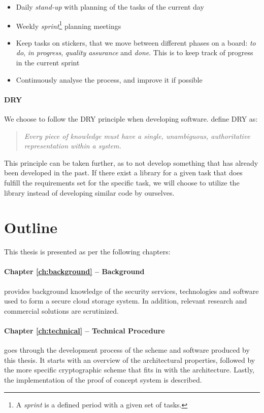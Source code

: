 \documentclass[pdftex,english,10pt,b5paper,twoside]{book}
\begin{document}
\begin{itemize}
  \item Daily \emph{stand-up} with planning of the tasks of the current day
  \item Weekly \emph{sprint}\footnote{A \emph{sprint} is a defined period with
    a given set of tasks.} planning meetings
  \item Keep tasks on stickers, that we move between different phases on a
    board: \emph{to do}, \emph{in progress}, \emph{quality assurance} and
    \emph{done}. This is to keep track of progress in the current sprint
  \item Continuously analyse the process, and improve it if possible
\end{itemize}

\paragraph{DRY} We choose to follow the \ac{DRY} principle when developing
software. \citet{dry} define \ac{DRY} as:

\begin{quote}\it
Every piece of knowledge must have a single, unambiguous, authoritative
representation within a system.
\end{quote}

\noindent This principle can be taken further, as to not develop something that
has already been developed in the past. If there exist a library for a given
task that does fulfill the requirements set for the specific task, we will
choose to utilize the library instead of developing similar code by ourselves.

\section{Outline}

This thesis is presented as per the following chapters:

\paragraph{Chapter \ref{ch:background} -- Background} provides background
knowledge of the security services, technologies and software used to form a
secure cloud storage system. In addition, relevant research and commercial
solutions are scrutinized.

\paragraph{Chapter \ref{ch:technical} -- Technical Procedure} goes through the
development process of the scheme and software produced by this thesis. It
starts with an overview of the architectural properties, followed by the more
specific cryptographic scheme that fits in with the architecture. Lastly, the
implementation of the proof of concept system is described.
\end{document}
